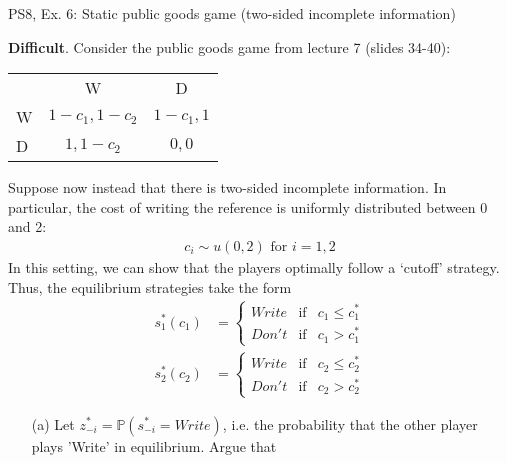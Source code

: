 \begin{frame}{PS8, Ex. 6: Static public goods game (two-sided incomplete information)}
  \begin{multicols}{2}
    \textbf{Difficult}. Consider the public goods game from lecture 7 (slides 34-40):
    \vspace{-6pt}
    \begin{table}
      \begin{tabular}{l|c|c|}
        \multicolumn{1}{c}{} & \multicolumn{1}{c}{W} & \multicolumn{1}{c}{D} \\\cline{2-3}
        W & $1-c_1,1-c_2$ & $1-c_1,1$ \\\cline{2-3}
        D & $1,1-c_2$     & $0,0$     \\\cline{2-3}
      \end{tabular}
    \end{table}
    \vspace{-6pt}
    Suppose now instead that there is two-sided incomplete information. In particular, the cost of writing the reference is uniformly distributed between 0 and 2:
    \vspace{-4pt}
    \begin{align*}
      c_i\sim u(0,2)\text{ for }i=1,2
    \end{align*}
    In this setting, we can show that the players optimally follow a ‘cutoff’ strategy. Thus, the equilibrium strategies take the form
    \vspace{-4pt}
    \begin{align*}
      s_1^*(c_1)&=\left\{\begin{array}{rcl}
        Write & \text{if} & c_1\leq c_1^*\\
        Don't & \text{if} & c_1>c_1^*
        \end{array}\right.\\
      s_2^*(c_2)&=\left\{\begin{array}{rcl}
        Write & \text{if} & c_2\leq c_2^*\\
        Don't & \text{if} & c_2>c_2^*
        \end{array}\right.
    \end{align*}
    \vfill\null\columnbreak
    \begin{itemize}
      \item[(a)] Let $z_{-i}^* = \mathbb{P}(s_{-i}^*=Write)$, i.e. the probability that the other player plays 'Write' in equilibrium. Argue that
      \vspace{-18pt}
      \begin{align}

\end{align}
\end{itemize}
\end{multicols}
\end{frame}

